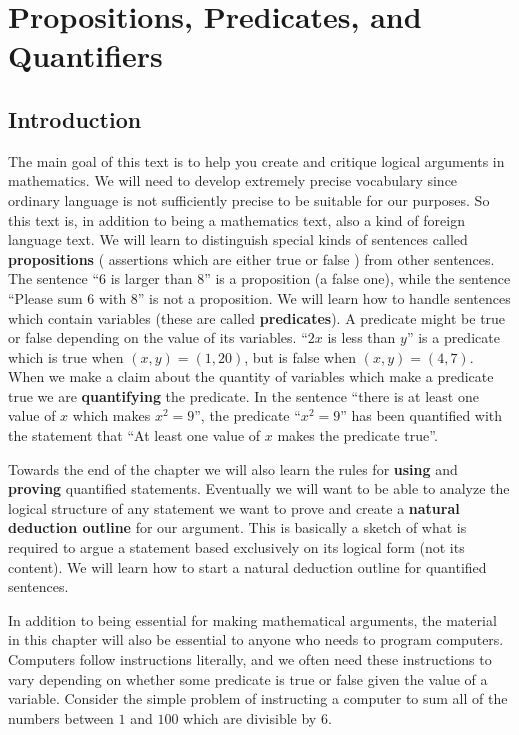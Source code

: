 \chapter{Propositions, Predicates, and Quantifiers}

\section{Introduction}

The main goal of this text is to help you create and critique logical arguments in mathematics.  We will need to develop extremely precise vocabulary since ordinary language is not sufficiently precise to be suitable for our purposes.  So this text is, in addition to being a mathematics text, also a kind of foreign language text.  We will learn to distinguish special kinds of sentences called \textbf{propositions} ( assertions which are either true or false ) from other sentences.  The sentence ``6 is larger than 8'' is a proposition (a false one), while the sentence ``Please sum 6 with 8'' is not a proposition.   We will learn how to handle sentences which contain variables (these are called \textbf{predicates}).  A predicate might be true or false depending on the value of its variables. ``$2x$  is less than $y$'' is a predicate which is true when $(x,y) = (1,20)$, but is false when $(x,y) = (4,7)$.  When we make a claim about the quantity of variables which make a predicate true we are \textbf{quantifying} the predicate.  In the sentence ``there is at least one value of $x$ which makes $x^2  = 9$'', the predicate ``$x^2 =9$'' has been quantified with the statement that ``At least one value of $x$ makes the predicate true''.  

Towards the end of the chapter we will also learn the rules for \textbf{using} and \textbf{proving} quantified statements.  Eventually we will want to be able to analyze the logical structure of any statement we want to prove and create a \textbf{natural deduction outline} for our argument.  This is basically a sketch of what is required to argue a statement based exclusively on its logical form (not its content).  We will learn how to start a natural deduction outline for quantified sentences.

In addition to being essential for making mathematical arguments, the material in this chapter will also be essential to anyone who needs to program computers.  Computers follow instructions literally, and we often need these instructions to vary depending on whether some predicate is true or false given the value of a variable.  Consider the simple problem of instructing a computer to sum all of the numbers between $1$ and $100$ which are divisible by $6$.

